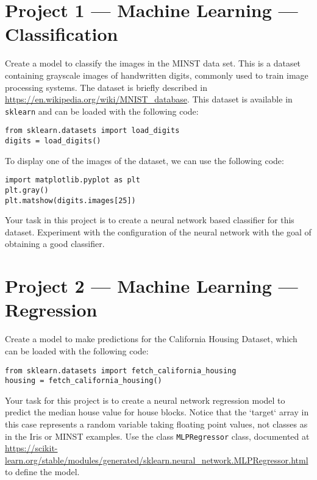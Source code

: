 \documentclass[12pt]{article}
\begin{document}
\section{Project 1 --- Machine Learning --- Classification}

Create a model to classify the images in the MINST data set. This is a dataset containing grayscale images of handwritten digits, commonly used to train image processing systems. The dataset is briefly described in \url{https://en.wikipedia.org/wiki/MNIST_database}. This dataset is available in \texttt{sklearn} and can be loaded with the following code:

\begin{lstlisting}
from sklearn.datasets import load_digits
digits = load_digits()
\end{lstlisting}

To display one of the images of the dataset, we can use the following code:

\begin{lstlisting}
import matplotlib.pyplot as plt
plt.gray()
plt.matshow(digits.images[25])
\end{lstlisting}

Your task in this project is to create a neural network based classifier for this dataset. Experiment with the configuration of the neural network with the goal of obtaining a good classifier.

\section{Project 2 --- Machine Learning --- Regression}

Create a model to make predictions for the California Housing Dataset, which can be loaded with the following code:

\begin{lstlisting}
from sklearn.datasets import fetch_california_housing
housing = fetch_california_housing()
\end{lstlisting}

Your task for this project is to create a neural network regression model to predict the median house value for house blocks. Notice that the `target` array in this case represents a random variable taking floating point values, not classes as in the Iris or MINST examples. Use the class \texttt{MLPRegressor} class, documented at \url{https://scikit-learn.org/stable/modules/generated/sklearn.neural_network.MLPRegressor.html} to define the model.
\end{document}
